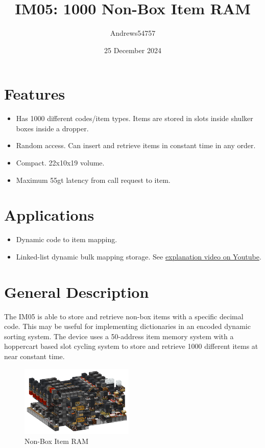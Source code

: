 \documentclass[10pt]{datasheet}
\title{IM05: 1000 Non-Box Item RAM}
\author{Andrews54757}
\date{25 December 2024}
\begin{document}
\maketitle

\section{Features}

\begin{itemize}
\item{Has 1000 different codes/item types. Items are stored in slots inside shulker boxes inside a dropper.}
\item{Random access. Can insert and retrieve items in constant time in any order.}
\item{Compact. 22x10x19 volume.}
\item{Maximum 55gt latency from call request to item.}
\end{itemize}

\section{Applications}
\begin{itemize}
\item{Dynamic code to item mapping.}
\item{Linked-list dynamic bulk mapping storage. See \href{https://www.youtube.com/watch?v=x6W-ZWkIdPE}{explanation video on Youtube}.}
\end{itemize}

\section{General Description}
The IM05 is able to store and retrieve non-box items with a specific decimal code. This may be useful for implementing dictionaries in an encoded dynamic sorting system. The device uses a 50-address item memory system with a hoppercart based slot cycling system to store and retrieve 1000 different items at near constant time.

\vfill\break

\begin{figure}[H]
    \centering
    \includegraphics[width=0.48\textwidth]{image_1 (1).png}
    \caption{ Non-Box Item RAM}
\end{figure}
\end{document}

